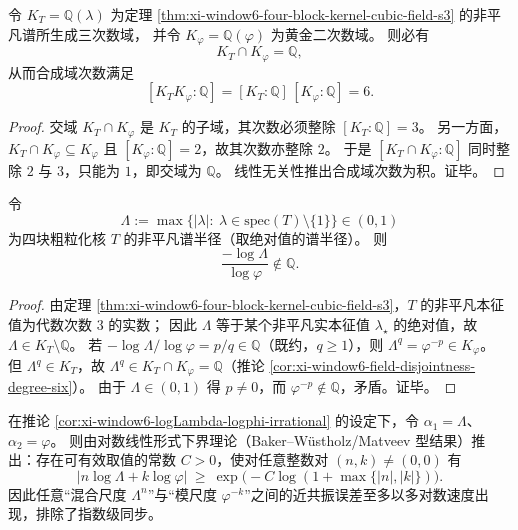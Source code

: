 \begin{corollary}\label{cor:xi-window6-field-disjointness-degree-six}
令 \(K_T=\mathbb Q(\lambda)\) 为定理 \ref{thm:xi-window6-four-block-kernel-cubic-field-s3} 的非平凡谱所生成三次数域，
并令 \(K_\varphi=\mathbb Q(\varphi)\) 为黄金二次数域。
则必有
\[
K_T\cap K_\varphi=\mathbb Q,
\]
从而合成域次数满足
\[
[K_TK_\varphi:\mathbb Q]=[K_T:\mathbb Q]\,[K_\varphi:\mathbb Q]=6.
\]
\end{corollary}

\begin{proof}
交域 \(K_T\cap K_\varphi\) 是 \(K_T\) 的子域，其次数必须整除 \([K_T:\mathbb Q]=3\)。
另一方面，\(K_T\cap K_\varphi\subseteq K_\varphi\) 且 \([K_\varphi:\mathbb Q]=2\)，故其次数亦整除 \(2\)。
于是 \([K_T\cap K_\varphi:\mathbb Q]\) 同时整除 \(2\) 与 \(3\)，只能为 \(1\)，即交域为 \(\mathbb Q\)。
线性无关性推出合成域次数为积。证毕。
\end{proof}

\begin{corollary}\label{cor:xi-window6-logLambda-logphi-irrational}
令
\[
\Lambda:=\max\{|\lambda|:\ \lambda\in\mathrm{spec}(T)\setminus\{1\}\}\in(0,1)
\]
为四块粗粒化核 \(T\) 的非平凡谱半径（取绝对值的谱半径）。
则
\[
\frac{-\log\Lambda}{\log\varphi}\notin\mathbb Q.
\]
\end{corollary}

\begin{proof}
由定理 \ref{thm:xi-window6-four-block-kernel-cubic-field-s3}，\(T\) 的非平凡本征值为代数次数 \(3\) 的实数；
因此 \(\Lambda\) 等于某个非平凡实本征值 \(\lambda_\star\) 的绝对值，故 \(\Lambda\in K_T\setminus\mathbb Q\)。
若 \(-\log\Lambda/\log\varphi=p/q\in\mathbb Q\)（既约，\(q\ge 1\)），则
\(
\Lambda^q=\varphi^{-p}\in K_\varphi
\)。
但 \(\Lambda^q\in K_T\)，故 \(\Lambda^q\in K_T\cap K_\varphi=\mathbb Q\)（推论 \ref{cor:xi-window6-field-disjointness-degree-six}）。
由于 \(\Lambda\in(0,1)\) 得 \(p\neq 0\)，而 \(\varphi^{-p}\notin\mathbb Q\)，矛盾。证毕。
\end{proof}

\begin{proposition}\label{prop:xi-window6-baker-effective-beat-bound}
在推论 \ref{cor:xi-window6-logLambda-logphi-irrational} 的设定下，令 \(\alpha_1=\Lambda\)、\(\alpha_2=\varphi\)。
则由对数线性形式下界理论（Baker--W\"ustholz/Matveev 型结果）推出：存在可有效取值的常数 \(C>0\)，使对任意整数对 \((n,k)\neq(0,0)\) 有
\[
\bigl|n\log\Lambda+k\log\varphi\bigr|
\ \ge\
\exp\!\bigl(-C\log(1+\max\{|n|,|k|\})\bigr).
\]
因此任意“混合尺度 \(\Lambda^n\)”与“模尺度 \(\varphi^{-k}\)”之间的近共振误差至多以多对数速度出现，排除了指数级同步。
\end{proposition}

